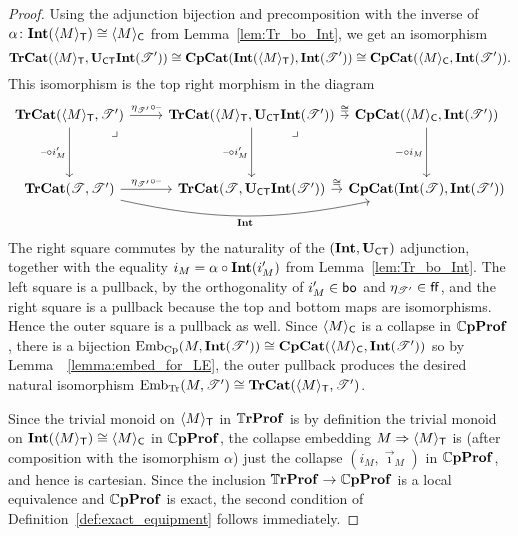 \documentclass[11pt,oneside,article]{memoir}
\begin{document}
\begin{proof}
  Using the adjunction bijection and precomposition with the inverse of
  $\alpha\colon\mathbf{Int}(\langle M\rangle_{\mathsf{T}})\cong\langle M\rangle_{\mathsf{C}}$ from Lemma~\ref{lem:Tr_bo_Int},
  we get an isomorphism
  \[
    \mathbf{TrCat}(\langle M\rangle_{\mathsf{T}},\mathbf{U}_{\mathsf{CT}}\mathbf{Int}(\mathscr{T}'))
    \cong \mathbf{CpCat}(\mathbf{Int}(\langle M\rangle_{\mathsf{T}}),\mathbf{Int}(\mathscr{T}'))
    \cong \mathbf{CpCat}(\langle M\rangle_{\mathsf{C}},\mathbf{Int}(\mathscr{T}')).
  \]
  This isomorphism is the top right morphism in the diagram
  \[ \begin{tikzcd}[column sep=between origins,row sep=between origins]
    \TrCat(\Col{M}_{\MTCfont{T}},\cat{T}')
        \ar[r,"\eta_{\cat{T}'}\circ\textrm{--}"]
        \ar[d,"\textrm{--}\circ i'_M"']
        \ar[dr,phantom,"\lrcorner" very near start]
      &[2.4em,between borders] \TrCat(\Col{M}_{\MTCfont{T}},\UCT\Int(\cat{T}'))
        \ar[d,"\textrm{--}\circ i'_M"']
        \ar[r,"\iso"]
        \ar[dr,phantom,"\lrcorner" very near start]
      &[12.8em] \CompCat(\Col{M}_{\MTCfont{C}},\Int(\cat{T}')) \ar[d,"-\circ i_M"'] \\[5.4em]
    \TrCat(\cat{T},\cat{T}')
        \ar[r,"\eta_{\cat{T}'}\circ\textrm{--}"]
        \ar[rr,bend right=12,"\Int"']
      & \TrCat(\cat{T},\UCT\Int(\cat{T}'))
        \ar[r,"\iso"]
      & \CompCat(\Int(\cat{T}),\Int(\cat{T}'))
  \end{tikzcd} \]
  The right square commutes by the naturality of the $(\mathbf{Int},\mathbf{U}_{\mathsf{CT}})$ adjunction, together with the
  equality $i_M=\alpha\circ\mathbf{Int}(i'_M)$ from Lemma~\ref{lem:Tr_bo_Int}. The left square is a
  pullback, by the orthogonality of $i'_M\in\mathsf{bo}$ and $\eta_{\mathscr{T}'}\in\mathsf{ff}$, and the right square
  is a pullback because the top and bottom maps are isomorphisms. Hence the outer square is a
  pullback as well. Since $\langle M\rangle_{\mathsf{C}}$ is a collapse in $\mathbb{C}\mathbf{pProf}$, there is a
  bijection $\mathrm{Emb}_{\mathrm{Cp}}(M,\mathbf{Int}(\mathscr{T}'))\cong\mathbf{CpCat}(\langle M\rangle_{\mathsf{C}},\mathbf{Int}(\mathscr{T}'))$
  so by Lemma~~\ref{lemma:embed_for_LE}, the outer pullback produces the desired natural isomorphism
  $\mathrm{Emb}_{\mathrm{Tr}}(M,\mathscr{T}')\cong\mathbf{TrCat}(\langle M\rangle_{\mathsf{T}},\mathscr{T}')$.

  Since the trivial monoid on $\langle M\rangle_{\mathsf{T}}$ in $\mathbb{T}\mathbf{rProf}$ is by definition the trivial
  monoid on $\mathbf{Int}(\langle M\rangle_{\mathsf{T}})\cong\langle M\rangle_{\mathsf{C}}$ in $\mathbb{C}\mathbf{pProf}$, the collapse
  embedding $M\Rightarrow\langle M\rangle_{\mathsf{T}}$ is (after composition with the isomorphism $\alpha$)
  just the collapse $(i_M,\vec{\imath}_M)$ in $\mathbb{C}\mathbf{pProf}$, and hence is cartesian. Since the
  inclusion $\mathbb{T}\mathbf{rProf}\to\mathbb{C}\mathbf{pProf}$ is a local equivalence and $\mathbb{C}\mathbf{pProf}$ is exact, the second
  condition of Definition~\ref{def:exact_equipment} follows immediately.
\end{proof}
\end{document}
